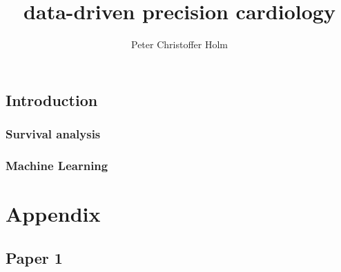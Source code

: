 \documentclass[%
    a4paper, twoside, dissertation, fontsize=12pt%
]{tufte-book}
\title{data-driven precision cardiology}
\author[Peter Christoffer Holm]{Peter Christoffer Holm}
\begin{document}
\frontmatter
\maketitle


\cleardoublepage
 
\tableofcontents
\listoffigures
\listoftables
\cleardoublepage


\mainmatter

\chapter{Introduction}
\section{Survival analysis}

\Blindtext[2]
\Blindtext[2]

\section{Machine Learning}

\Blindtext[5]


\backmatter
% 
% 


\part*{Appendix}

\appendix

\chapter{Paper 1}


\end{document}
